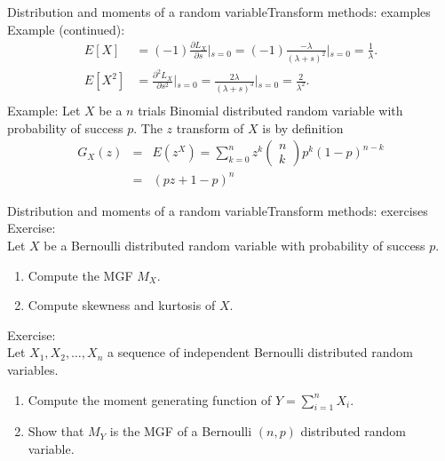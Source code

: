 \documentclass[handout]{beamer}
\begin{document}
\begin{frame}{Distribution and moments of a random variable}{Transform methods: examples}
Example (continued):
 \begin{align*}
  E\left[ X\right] &= (-1)\frac{\partial L_X}{\partial s} \left \vert_{s=0} \right. = 
(-1)\frac{-\lambda}{(\lambda + s)^2} \left \vert _ {s=0} \right. = \frac{1}{\lambda}. \\
  E\left[ X^2\right] &= \frac{\partial^2 L_X}{\partial s^2} \left \vert_{s=0} \right. = 
\frac{2\lambda}{(\lambda + s)^3} \left \vert _ {s=0} \right. = \frac{2}{\lambda^2}. \\
 \end{align*}
Example:
Let $X$ be a $n$ trials Binomial distributed random variable with probability of success $p$. The $z$ 
transform of $X$ is by definition
\begin{eqnarray*}
 G_X(z) &=& E(z^X) = \sum_{k=0}^n z^k \left( \begin{array}{c}
n\\
k
\end{array} \right) p^k (1-p)^{n-k} \\
&=& (pz+1-p)^n
\end{eqnarray*}

\end{frame}

\begin{frame}{Distribution and moments of a random variable}{Transform methods: exercises}
Exercise:\\
Let $X$ be a Bernoulli distributed random variable with probability of success $p$.
\begin{enumerate}
 \item Compute the MGF $M_X$.
 \item Compute skewness and kurtosis of $X$. 
\end{enumerate}
\vspace{0.8cm}
Exercise:\\
Let $X_1, X_2, \dots,X_n$ a sequence of independent Bernoulli distributed random variables. 
\begin{enumerate}
 \item Compute the moment generating function of $Y=\sum_{i=1}^n X_i$.
 \item Show that $M_Y$ is the MGF of a Bernoulli $(n,p)$ distributed random variable.
\end{enumerate}
\end{frame}
\end{document}
